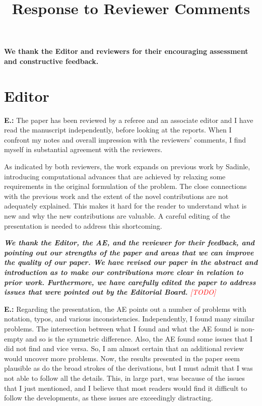 \documentclass[letterpaper, parskip]{scrartcl}
\newcommand{\pointRaised}[2]{%
	\textbf{#1.\theresponsectr:} #2
}
\newcounter{responsectr}[section]     %
\newcommand{\reply}[1]{%
	\refstepcounter{responsectr}%
		\begin{tcolorbox}
			\itshape #1
		\end{tcolorbox}
}
\newcommand{\todo}{\textcolor{red}{[TODO]}\xspace}
\begin{document}

	\title{Response to Reviewer Comments}

	\maketitle
	\textbf{We thank the Editor and reviewers for their encouraging assessment and constructive
	feedback.}


	\section*{Editor}


	\pointRaised{E}{%
	The paper has been reviewed by a referee and an associate editor and I have read the manuscript independently, before looking at the reports.  When I confront my notes and overall impression with the reviewers’ comments, I find myself in substantial agreement with the reviewers.

	As indicated by both reviewers, the work expands on previous work by Sadinle, introducing computational advances that are achieved by relaxing some requirements in the original formulation of the problem.  The close connections with the previous work and the extent of the novel contributions are not adequately explained.  This makes it hard for the reader to understand what is new and why the new contributions are valuable.  A careful editing of the presentation is needed to address this shortcoming.}

	\reply{%
\textbf{We thank the Editor, the AE, and the reviewer for their feedback, and pointing out our strengths of the paper and areas that we can improve the quality of our paper. We have revised our paper in the abstract and introduction as to make our contributions more clear in relation to prior work.  Furthermore, we have carefully edited the paper to address issues that were pointed out by the Editorial Board.} \todo
	}

	\newpage

	\pointRaised{E}{%
	Regarding the presentation, the AE points out a number of problems with notation, typos, and various inconsistencies.  Independently, I found many similar problems.  The intersection between what I found and what the AE found is non-empty and so is the symmetric difference.  Also, the AE found some issues that I did not find and vice versa.  So, I am almost certain that an additional review would uncover more problems.  Now, the results presented in the paper seem plausible as do the broad strokes of the derivations, but I must admit that I was not able to follow all the details. This, in large part, was because of the issues that I just mentioned, and I believe that most readers would find it difficult to follow the developments, as these issues are exceedingly distracting.
	}
	
\end{document}
